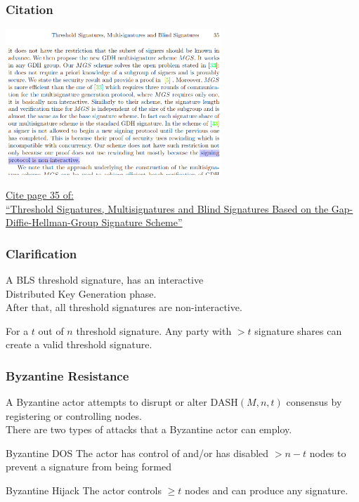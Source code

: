 \documentclass[english,handout]{beamer}
\begin{document}
\begin{frame}
\frametitle{Citation}
\begin{center}
\includegraphics[width=3.2in]{non-interactive.png}
\end{center}

\href{https://blog.tappmath.com/files/Boldyreva2002.pdf}{Cite page 35 of: \\``Threshold Signatures, Multisignatures and Blind Signatures Based on the Gap-Diffie-Hellman-Group Signature Scheme''}

\end{frame}

\begin{frame}
\frametitle{Clarification}

\begin{center}
A BLS threshold signature, has an interactive \\ Distributed Key Generation phase. \\
\vspace{10pt}
After that, all threshold signatures are non-interactive.

For a $t$ out of $n$ threshold signature.  Any party with $>t$
signature shares can create a valid threshold signature.
\end{center}
\end{frame}

\begin{frame}
\frametitle{Byzantine Resistance}


A Byzantine actor attempts to disrupt or alter $\textrm{DASH}(M,n,t)$ consensus by registering or
controlling nodes.  \\
There are two types of attacks that a Byzantine actor can employ.

\vfill

\begin{block}{Byzantine DOS}
The actor has control of and/or has disabled $> n-t$ nodes to prevent a signature from being formed
\end{block}
\vfill

\begin{block}{Byzantine Hijack}
The actor controls $\geq t$ nodes and can produce any signature.
\end{block}


\end{frame}
\end{document}
